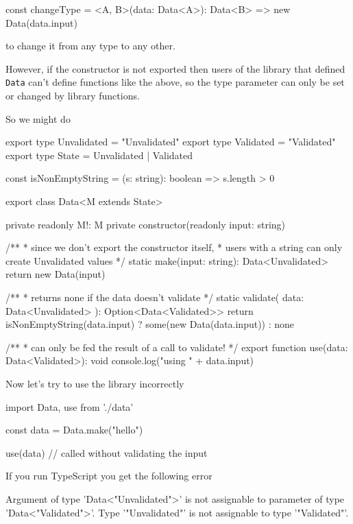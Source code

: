 \documentclass[12pt]{article}
\theoremstyle{definition}
\newenvironment{code}
  {\vspace{0.5cm} \VerbatimEnvironment\begin{typescriptcode}}
  {\end{typescriptcode} \vspace{0.2cm}}
\begin{document}
\begin{code}
const changeType = <A, B>(data: Data<A>): Data<B> =>
  new Data(data.input)
\end{code}

to change it from any type to any other.

However, if the constructor is not exported then users of the library that defined \texttt{Data} can't define functions like the above,
so the type parameter can only be set or changed by library functions.

So we might do

\begin{code}
export type Unvalidated = "Unvalidated"
export type Validated = "Validated"
export type State = Unvalidated | Validated

const isNonEmptyString = (s: string): boolean => s.length > 0

export class Data<M extends State> {
  private readonly M!: M
  private constructor(readonly input: string) {}

  /**
   * since we don't export the constructor itself,
   * users with a string can only create Unvalidated values
   */
  static make(input: string): Data<Unvalidated> {
    return new Data(input)
  }

  /**
   * returns none if the data doesn't validate
   */
  static validate(
    data: Data<Unvalidated>
  ): Option<Data<Validated>> {
    return isNonEmptyString(data.input)
      ? some(new Data(data.input))
      : none
  }
}

/**
 * can only be fed the result of a call to validate!
 */
export function use(data: Data<Validated>): void {
  console.log("using " +  data.input)
}
\end{code}

Now let's try to use the library incorrectly

\begin{code}
import { Data, use } from './data'

const data = Data.make("hello")

use(data) // called without validating the input
\end{code}

If you run TypeScript you get the following error

\begin{code}
[ts]
Argument of type 'Data<"Unvalidated">' is not assignable
  to parameter of type 'Data<"Validated">'.
  Type '"Unvalidated"' is not assignable to type '"Validated"'.
\end{code}
\end{document}
